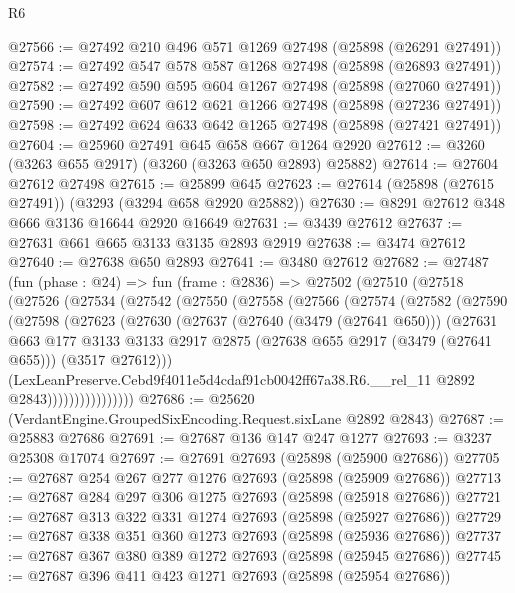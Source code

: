 \begin{lexlean}{R6}
\begin{coremodule}
@27566 := @27492 @210 @496 @571 @1269 @27498 (@25898 (@26291 @27491))
@27574 := @27492 @547 @578 @587 @1268 @27498 (@25898 (@26893 @27491))
@27582 := @27492 @590 @595 @604 @1267 @27498 (@25898 (@27060 @27491))
@27590 := @27492 @607 @612 @621 @1266 @27498 (@25898 (@27236 @27491))
@27598 := @27492 @624 @633 @642 @1265 @27498 (@25898 (@27421 @27491))
@27604 := @25960 @27491 @645 @658 @667 @1264 @2920
@27612 := @3260 (@3263 @655 @2917) (@3260 (@3263 @650 @2893) @25882)
@27614 := @27604 @27612 @27498
@27615 := @25899 @645
@27623 := @27614 (@25898 (@27615 @27491)) (@3293 (@3294 @658 @2920 @25882))
@27630 := @8291 @27612 @348 @666 @3136 @16644 @2920 @16649
@27631 := @3439 @27612
@27637 := @27631 @661 @665 @3133 @3135 @2893 @2919
@27638 := @3474 @27612
@27640 := @27638 @650 @2893
@27641 := @3480 @27612
@27682 := @27487
    (fun (phase : @24) =>
    fun (frame : @2836) =>
    @27502
      (@27510
        (@27518
          (@27526
            (@27534
              (@27542
                (@27550
                  (@27558
                    (@27566
                      (@27574
                        (@27582
                          (@27590
                            (@27598
                              (@27623
                                (@27630
                                  (@27637
                                    (@27640 (@3479 (@27641 @650)))
                                    (@27631
                                      @663
                                      @177
                                      @3133
                                      @3133
                                      @2917
                                      @2875
                                      (@27638 @655 @2917 (@3479 (@27641 @655)))
                                      (@3517 @27612)))
                                  (LexLeanPreserve.Cebd9f4011e5d4cdaf91cb0042ff67a38.R6.__rel_11
                                    @2892
                                    @2843))))))))))))))))
@27686 := @25620 (VerdantEngine.GroupedSixEncoding.Request.sixLane @2892 @2843)
@27687 := @25883 @27686
@27691 := @27687 @136 @147 @247 @1277
@27693 := @3237 @25308 @17074
@27697 := @27691 @27693 (@25898 (@25900 @27686))
@27705 := @27687 @254 @267 @277 @1276 @27693 (@25898 (@25909 @27686))
@27713 := @27687 @284 @297 @306 @1275 @27693 (@25898 (@25918 @27686))
@27721 := @27687 @313 @322 @331 @1274 @27693 (@25898 (@25927 @27686))
@27729 := @27687 @338 @351 @360 @1273 @27693 (@25898 (@25936 @27686))
@27737 := @27687 @367 @380 @389 @1272 @27693 (@25898 (@25945 @27686))
@27745 := @27687 @396 @411 @423 @1271 @27693 (@25898 (@25954 @27686))

\end{coremodule}
\end{lexlean}
